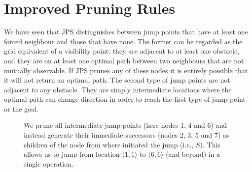 \section{Improved Pruning Rules}
\label{sec::pruning}
We have seen that JPS distinguishes between jump points that have at least 
one forced neighbour and those that have none.
The former can be regarded as
the grid equivalent of a visibility point: they are adjacent to at least one
obstacle, and they are on at least one optimal path between two neighbours
that are not mutually observable. If JPS prunes any of these nodes it is
entirely possible that it will not return an optimal path.  The second type of
jump points are not adjacent to any obstacle. They are simply intermediate
locations where the optimal path can change direction in order to reach the
first type of jump point or the goal.
\par
\begin{figure}[tb]
  \caption{\small We prune all intermediate jump points (here nodes 1, 4 and 6) and
	instead generate their immediate successors (nodes 2, 3, 5 and 7) as
	children of the node from where initiated the jump (i.e., $S$). This 
	allows us to jump from location $\langle 1, 1\rangle$ to $\langle 6, 6\rangle$ (and beyond)
	in a single operation.}
  \label{fig::pruning}
\end{figure}

